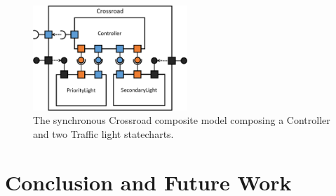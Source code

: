 \begin{figure}[!h]
	\centering
	\includegraphics[width=0.52\textwidth]{figures/Controller-gcd.pdf}
	\caption{The synchronous Crossroad composite model composing a Controller and two Traffic light statecharts.}
	\label{fig:block_diagram_cropped2}
\end{figure}

\section{Conclusion and Future Work}
\label{sec:conclusion}

